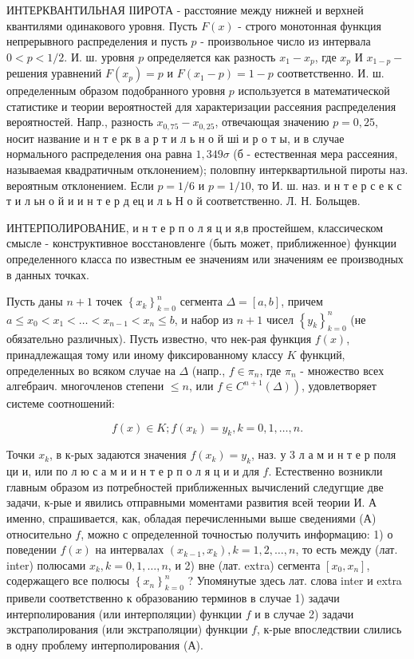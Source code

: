\documentclass[10pt]{article}
\begin{document}
ИНТЕРКВАНТИЛЬНАЯ ІІИРОТА - расстояние между нижней и верхней квантилями одинакового уровня. Пусть $F(x)$ - строго монотонная функция непрерывного распределения и пусть $p$ - произвольное число из интервала $0<p<1 / 2$. И. ш. уровня $p$ определяется как разность $x_{1}-x_{p}$, где $x_{p}$ И $x_{1-p}-$ решения уравнений $F\left(x_{p}\right)=p$ и $F\left(x_{1}-p\right)=1-p$ соответственно. И. ш. определенным образом подобранного уровня $p$ используется в математической статистике и теории вероятностей для характеризации рассеяния распределения вероятностей. Напр., разность $x_{0,75}-x_{0,25}$, отвечающая значению $p=0,25$, носит название и н т е рк в а р т и л ь н о й ші и р о т ы, и в случае нормального распределения она равна $1,349 \sigma$ (б - естественная мера рассеяния, называемая квадратичным отклонением); половпну интерквартильной пироты наз. вероятным отклонением. Если $p=1 / 6$ и $p=1 / 10$, то И. ш. наз. и н т е р с е к с т и л ьн о й и и н т е р д ец и л ь Н о й соответственно. Л. Н. Больщев.



ИНТЕРПОЛИРОВАНИЕ, и н т е р п о л я ц и я,в простейшем, классическом смысле - конструктивное восстановленге (быть может, приближенное) функции определенного класса по известным ее значениям или значениям ее производных в данных точках.



Пусть даны $n+1$ точек $\left\{x_{k}\right\}_{k=0}^{n}$ сегмента $\Delta=[a, b]$, причем $a \leqslant x_{0}<x_{1}<\ldots<x_{n-1}<x_{n} \leqslant b$, и набор из $n+1$ чисел $\left\{y_{k}\right\}_{k=0}^{n}$ (не обязательно различных). Пусть известно, что нек-рая функция $f(x)$, принадлежащая тому или иному фиксированному классу $K$ функций, определенных во всяком случае на $\Delta$ (напр., $f \in \pi_{n}$, где $\pi_{n}$ - множество всех алгебраич. многочленов степени $\leqslant n$, или $\left.f \in C^{n+1}(\Delta)\right)$, удовлетворяет системе соотношений:



\[

f(x) \in K ; f\left(x_{k}\right)=y_{k}, k=0,1, \ldots, n .

\]



Точки $x_{k}$, в к-рых задаются значения $f\left(x_{k}\right)=y_{k}$, наз. у 3 л а м и н т е р поля ци и, или по л ю с а м и и н т е р п о л я ц и и для $f$. Естественно возникли главным образом из потребностей приближенных вычислений следугщие две задачи, к-рые и явились отправными моментами развития всей теории И. А именно, спрашивается, как, обладая перечисленными выше сведениями (А) относительно $f$, можно с определенной точностью получить информацию: 1) о поведении $f(x)$ на интервалах $\left(x_{k-1}, x_{k}\right), k=1,2, \ldots, n$, то есть между (лат. inter) полюсами $x_{k}, k=0,1, \ldots, n$, и 2) вне (лат. extra) сегмента $\left[x_{0}, x_{n}\right]$, содержащего все полюсы $\left\{x_{n}\right\}_{k=0}^{n}$ ? Упомянутые здесь лат. слова inter и extra привели соответственно к образованию терминов в случае 1) задачи интерполирования (или интерполяции) функции $f$ и в случае 2) задачи экстраполирования (или экстраполяции) функции $f$, к-рые впоследствии слились в одну проблему интерполирования (А).
\end{document}

